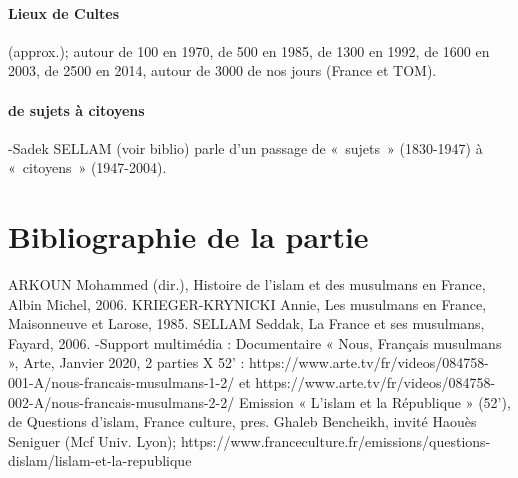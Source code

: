 \paragraph{Lieux de Cultes}
 (approx.); autour de 100 en 1970, de 500 en 1985, de 1300 en 1992, de 1600 en 2003, de 2500 en 2014, autour de 3000 de nos jours (France et TOM).

\paragraph{de sujets à citoyens}
-Sadek SELLAM (voir biblio) parle d’un passage de « sujets » (1830-1947) à « citoyens » (1947-2004).


\section{Bibliographie de la partie}
ARKOUN Mohammed (dir.), Histoire de l’islam et des musulmans en France, Albin
Michel, 2006.
KRIEGER-KRYNICKI Annie, Les musulmans en France, Maisonneuve et Larose,
1985.
SELLAM Seddak, La France et ses musulmans, Fayard, 2006.
-Support multimédia :
Documentaire « Nous, Français musulmans », Arte, Janvier 2020, 2 parties X 52’ :
https://www.arte.tv/fr/videos/084758-001-A/nous-francais-musulmans-1-2/ et
https://www.arte.tv/fr/videos/084758-002-A/nous-francais-musulmans-2-2/
Emission « L’islam et la République » (52’), de Questions d’islam, France culture,
pres. Ghaleb Bencheikh, invité Haouès Seniguer (Mcf Univ. Lyon);
https://www.franceculture.fr/emissions/questions-dislam/lislam-et-la-republique